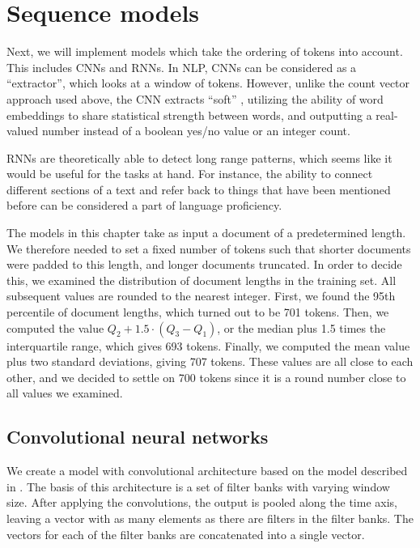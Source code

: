 \chapter{Sequence models}

Next, we will implement models which take the ordering of tokens into
account. This includes \acp{CNN} and \acp{RNN}. In \ac{NLP}, \acp{CNN} can be
considered as a ``\ngram extractor'', which looks at a window of tokens.
However, unlike the count vector approach used above, the CNN extracts
``soft'' \ngrams, utilizing the ability of word embeddings to share
statistical strength between words, and outputting a real-valued number
instead of a boolean yes/no value or an integer count.

\acp{RNN} are theoretically able to detect long range patterns, which seems
like it would be useful for the tasks at hand. For instance, the ability to
connect different sections of a text and refer back to things that have been
mentioned before can be considered a part of language proficiency.

The models in this chapter take as input a document of a predetermined
length. We therefore needed to set a fixed number of tokens such that shorter
documents were padded to this length, and longer documents truncated. In
order to decide this, we examined the distribution of document lengths in the
training set. All subsequent values are rounded to the nearest integer.
First, we found the 95th percentile of document lengths, which turned out to
be 701 tokens. Then, we computed the value $Q_2 + 1.5 \cdot (Q_3 - Q_1)$, or
the median plus 1.5 times the interquartile range, which gives 693 tokens.
Finally, we computed the mean value plus two standard deviations, giving 707
tokens. These values are all close to each other, and we decided to settle on
700 tokens since it is a round number close to all values we examined.


\section{Convolutional neural networks}

We create a model with convolutional architecture based on the model
described in \textcite{zhang2017sensitivity}. The basis of this architecture
is a set of filter banks with varying window size. After applying the
convolutions, the output is pooled along the time axis, leaving a vector with
as many elements as there are filters in the filter banks. The vectors for
each of the filter banks are concatenated into a single vector.


